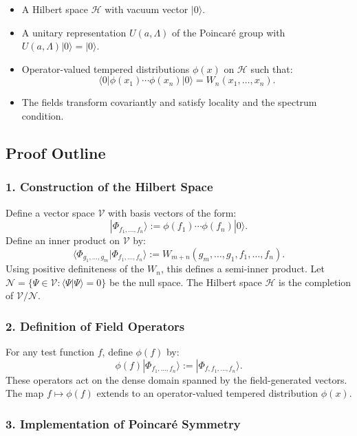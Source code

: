\documentclass{article}
\newcommand{\1}{\mathbbm{1}}
\theoremstyle{plain}
\theoremstyle{definition}
\numberwithin{equation}{section}
\begin{document}
\begin{itemize}
  \item A Hilbert space $\mathcal{H}$ with vacuum vector $|0\rangle$.
  \item A unitary representation $U(a, \Lambda)$ of the Poincaré group with $U(a, \Lambda)|0\rangle = |0\rangle$.
  \item Operator-valued tempered distributions $\phi(x)$ on $\mathcal{H}$ such that:
  \[
  \langle 0 | \phi(x_1) \cdots \phi(x_n) | 0 \rangle = W_n(x_1, \dots, x_n).
  \]
  \item The fields transform covariantly and satisfy locality and the spectrum condition.
\end{itemize}

\subsection{Proof Outline}

\subsubsection{1. Construction of the Hilbert Space}

Define a vector space $\mathscr{V}$ with basis vectors of the form:
\[
|\Phi_{f_1, \dots, f_n} \rangle := \phi(f_1) \cdots \phi(f_n) |0\rangle.
\]
Define an inner product on $\mathscr{V}$ by:
\[
\langle \Phi_{g_1, \dots, g_m} | \Phi_{f_1, \dots, f_n} \rangle := W_{m+n}(g_m, \dots, g_1, f_1, \dots, f_n).
\]
Using positive definiteness of the $W_n$, this defines a semi-inner product. Let $\mathscr{N} = \{ \Psi \in \mathscr{V} : \langle \Psi | \Psi \rangle = 0 \}$ be the null space. The Hilbert space $\mathcal{H}$ is the completion of $\mathscr{V}/\mathscr{N}$.

\subsubsection{2. Definition of Field Operators}

For any test function $f$, define $\phi(f)$ by:
\[
\phi(f) |\Phi_{f_1, \dots, f_n}\rangle := |\Phi_{f, f_1, \dots, f_n}\rangle.
\]
These operators act on the dense domain spanned by the field-generated vectors. The map $f \mapsto \phi(f)$ extends to an operator-valued tempered distribution $\phi(x)$.

\subsubsection{3. Implementation of Poincaré Symmetry}
\end{document}
